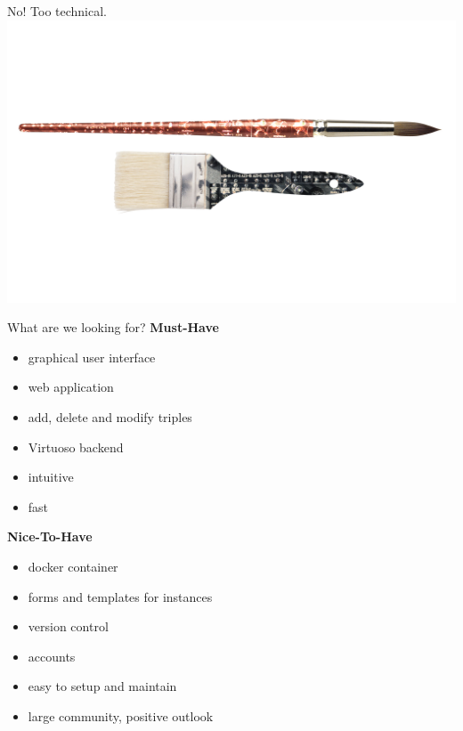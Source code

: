 \documentclass[aspectratio=1610]{beamer}
\begin{document}
\begin{frame}{No! Too technical.}
\centering
\includegraphics[width=0.9\paperwidth]{img/complicated.png}
\end{frame}

\begin{frame}{What are we looking for?}
\centering
\textbf{Must-Have}
\begin{itemize}
\item graphical user interface
\item web application
\item add, delete and modify triples 
\item Virtuoso backend
\item intuitive 
\item fast
\end{itemize}
\textbf{Nice-To-Have}
\begin{itemize}
\item docker container 
\item forms and templates for instances 
\item version control
\item accounts
\item easy to setup and maintain
\item large community, positive outlook
\end{itemize}
\end{frame}
\end{document}
